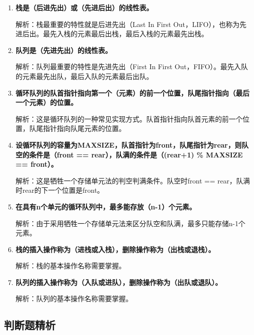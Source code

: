 \documentclass[12pt, a4paper]{article}
\begin{document}
\begin{enumerate}
	\item \textbf{栈是（后进先出）或（先进后出）的线性表。}

	      解析：栈最重要的特性就是后进先出（Last In First Out，LIFO），也称为先进后出。最先入栈的元素最后出栈，最后入栈的元素最先出栈。

	\item \textbf{队列是（先进先出）的线性表。}

	      解析：队列最重要的特性是先进先出（First In First Out，FIFO）。最先入队的元素最先出队，最后入队的元素最后出队。

	\item \textbf{循环队列的队首指针指向第一个（元素）的前一个位置，队尾指针指向（最后一个元素）的位置。}

	      解析：这是循环队列的一种常见实现方式。队首指针指向队首元素的前一个位置，队尾指针指向队尾元素的位置。

	\item \textbf{设循环队列的容量为MAXSIZE，队首指针为front，队尾指针为rear，则队空的条件是（front == rear），队满的条件是（(rear+1) \% MAXSIZE == front）。}

	      解析：这是牺牲一个存储单元法的判空判满条件。队空时front == rear，队满时rear的下一个位置是front。

	\item \textbf{在具有n个单元的循环队列中，最多能存放（n-1）个元素。}

	      解析：由于采用牺牲一个存储单元法来区分队空和队满，最多只能存储n-1个元素。

	\item \textbf{栈的插入操作称为（进栈或入栈），删除操作称为（出栈或退栈）。}

	      解析：栈的基本操作名称需要掌握。

	\item \textbf{队列的插入操作称为（入队或进队），删除操作称为（出队或退队）。}

	      解析：队列的基本操作名称需要掌握。
\end{enumerate}

\subsection{判断题精析}
\end{document}
